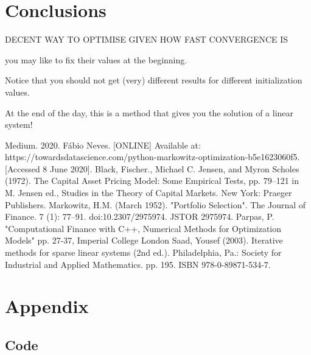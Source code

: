 \documentclass{article}
\begin{document}
\section{Conclusions}
\label{sec:concs}


DECENT WAY TO OPTIMISE GIVEN HOW FAST CONVERGENCE IS


you may like to fix their values at the beginning.

Notice that you should not get (very) different results for different initialization values.

At the end of the day, this is a method that gives you the solution of a linear system!




\begin{thebibliography}{}
\label{sec:thebibliography}
	 Medium. 2020. Fábio Neves. [ONLINE] Available at: https://towardsdatascience.com/python-markowitz-optimization-b5e1623060f5. [Accessed 8 June 2020].
	 Black, Fischer., Michael C. Jensen, and Myron Scholes (1972). The Capital Asset Pricing Model: Some Empirical Tests, pp. 79–121 in M. Jensen ed., Studies in the Theory of Capital Markets. New York: Praeger Publishers.
	 Markowitz, H.M. (March 1952). "Portfolio Selection". The Journal of Finance. 7 (1): 77–91. doi:10.2307/2975974. JSTOR 2975974.
	 Parpas, P. "Computational Finance with C++, Numerical Methods for Optimization Models" pp. 27-37, Imperial College London
	 Saad, Yousef (2003). Iterative methods for sparse linear systems (2nd ed.). Philadelphia, Pa.: Society for Industrial and Applied Mathematics. pp. 195. ISBN 978-0-89871-534-7.
	
	
	
\end{thebibliography} 



\section{Appendix} 
\label{sec:appendix}

\subsection{Code} 
\label{sec:code}
\end{document}
